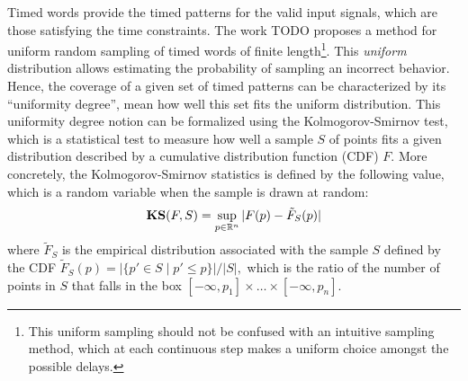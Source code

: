 Timed words provide the timed patterns for the valid input signals, which are those satisfying the time constraints. The work \cite{BBBK16} {\color{red}TODO} proposes a method for uniform random sampling of timed words of finite length\footnote{This uniform sampling should not be confused with an intuitive sampling method, which at each continuous step makes a uniform choice amongst the possible delays.}. This \emph{uniform} distribution allows estimating the probability of sampling an incorrect behavior. Hence, the coverage of a given set of timed patterns can be characterized by its ``uniformity degree'', mean how well this set fits the uniform distribution. This uniformity degree notion can be formalized using the Kolmogorov-Smirnov test, which is a statistical test to measure how well a sample $S$ of points fits a given distribution described by a cumulative distribution function (CDF) $F$. More concretely, the Kolmogorov-Smirnov statistics is defined by the following value, which is a random variable when the sample is drawn at random:
%
%
%
%
%
$$\mathbf{KS}(F,S)=\sup_{p\in\mathbb{R}^n}|F(p)-\tilde F_S(p)|$$
where $\tilde F_S$ is the empirical distribution associated with the sample $S$ defined by the CDF 
$\tilde F_S(p)=|\{p'\in S\mid  p'\leq p\}|/|S|,$ which is the ratio of the number of points in $S$ that falls in the box $[-\infty, p_1]\times \ldots\times [-\infty, p_n].$ 
